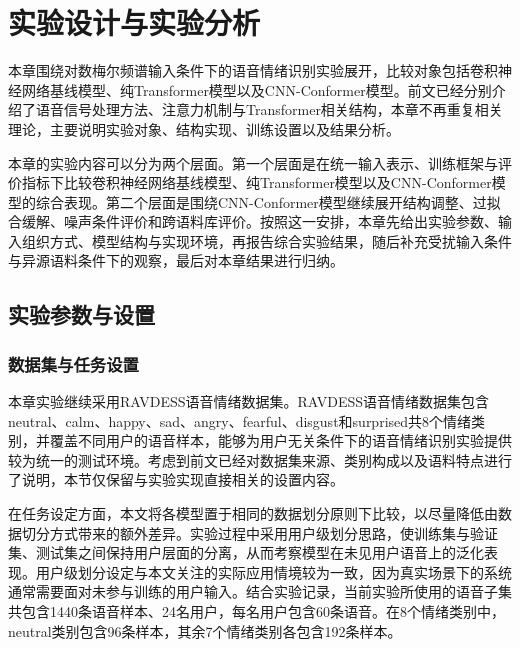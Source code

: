 \chapter{实验设计与实验分析}

本章围绕对数梅尔频谱输入条件下的语音情绪识别实验展开，比较对象包括卷积神经网络基线模型、纯Transformer模型以及CNN-Conformer模型。前文已经分别介绍了语音信号处理方法、注意力机制与Transformer相关结构，本章不再重复相关理论，主要说明实验对象、结构实现、训练设置以及结果分析。

本章的实验内容可以分为两个层面。第一个层面是在统一输入表示、训练框架与评价指标下比较卷积神经网络基线模型、纯Transformer模型以及CNN-Conformer模型的综合表现。第二个层面是围绕CNN-Conformer模型继续展开结构调整、过拟合缓解、噪声条件评价和跨语料库评价。按照这一安排，本章先给出实验参数、输入组织方式、模型结构与实现环境，再报告综合实验结果，随后补充受扰输入条件与异源语料条件下的观察，最后对本章结果进行归纳。


\section{实验参数与设置}

\subsection{数据集与任务设置}

本章实验继续采用RAVDESS语音情绪数据集。RAVDESS语音情绪数据集包含neutral、calm、happy、sad、angry、fearful、disgust和surprised共8个情绪类别，并覆盖不同用户的语音样本，能够为用户无关条件下的语音情绪识别实验提供较为统一的测试环境。考虑到前文已经对数据集来源、类别构成以及语料特点进行了说明，本节仅保留与实验实现直接相关的设置内容。

在任务设定方面，本文将各模型置于相同的数据划分原则下比较，以尽量降低由数据切分方式带来的额外差异。实验过程中采用用户级划分思路，使训练集与验证集、测试集之间保持用户层面的分离，从而考察模型在未见用户语音上的泛化表现。用户级划分设定与本文关注的实际应用情境较为一致，因为真实场景下的系统通常需要面对未参与训练的用户输入。结合实验记录，当前实验所使用的语音子集共包含1440条语音样本、24名用户，每名用户包含60条语音。在8个情绪类别中，neutral类别包含96条样本，其余7个情绪类别各包含192条样本。

